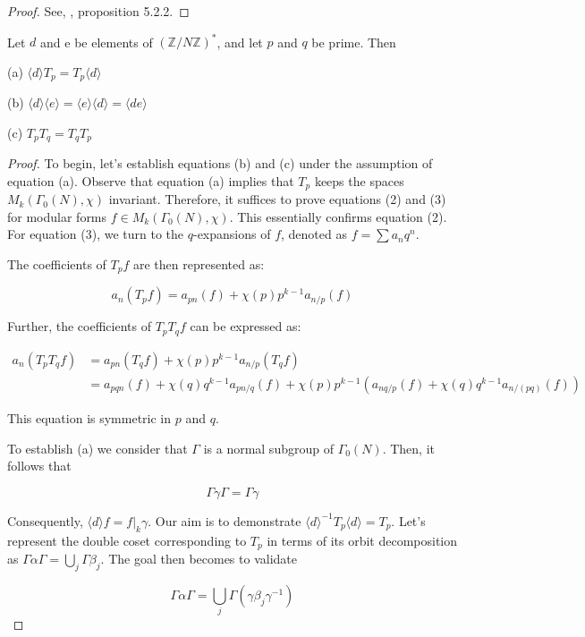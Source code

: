 \begin{proof}
    See, \cite{diamond2005first}, proposition 5.2.2.
\end{proof}
 \begin{proposition}
     Let $d$ and e be elements of $(\mathbb{Z} / N \mathbb{Z})^{*}$, and let $p$ and $q$ be prime. Then

(a) $\langle d\rangle T_{p}=T_{p}\langle d\rangle$

(b) $\langle d\rangle\langle e\rangle=\langle e\rangle\langle d\rangle=\langle d e\rangle$

(c) $T_{p} T_{q}=T_{q} T_{p}$
\begin{proof}
    To begin, let's establish equations (b) and (c) under the assumption of equation (a). Observe that equation (a) implies that \( T_p \) keeps the spaces \( M_k(\Gamma_0(N), \chi) \) invariant. Therefore, it suffices to prove equations (2) and (3) for modular forms \( f \in M_k(\Gamma_0(N), \chi) \). This essentially confirms equation (2). For equation (3), we turn to the \( q \)-expansions of \( f \), denoted as \( f = \sum a_n q^n \).

The coefficients of \( T_p f \) are then represented as:

\[
a_n(T_p f) = a_{pn}(f) + \chi(p) p^{k-1} a_{n/p}(f)
\]

Further, the coefficients of \( T_p T_q f \) can be expressed as:

\[
\begin{aligned}
a_n(T_p T_q f) &= a_{pn}(T_q f) + \chi(p) p^{k-1} a_{n/p}(T_q f) \\
&= a_{pqn}(f) + \chi(q) q^{k-1} a_{pn/q}(f) + \chi(p) p^{k-1} (a_{nq/p}(f) + \chi(q) q^{k-1} a_{n/(pq)}(f))
\end{aligned}
\]

This equation is symmetric in \( p \) and \( q \). 

To establish (a) we consider that \( \Gamma \) is a normal subgroup of \( \Gamma_{0}(N) \). Then, it follows that 

\[
\Gamma \gamma \Gamma = \Gamma \gamma
\]

Consequently, \( \langle d \rangle f = f|_{k} \gamma \). Our aim is to demonstrate \( \langle d \rangle^{-1} T_{p} \langle d \rangle = T_{p} \). Let's represent the double coset corresponding to \( T_{p} \) in terms of its orbit decomposition as \( \Gamma \alpha \Gamma = \bigcup_{j} \Gamma \beta_{j} \). The goal then becomes to validate 

\[
\Gamma \alpha \Gamma = \bigcup_{j} \Gamma(\gamma \beta_{j} \gamma^{-1})
\]


\end{proof}
\end{proposition}
